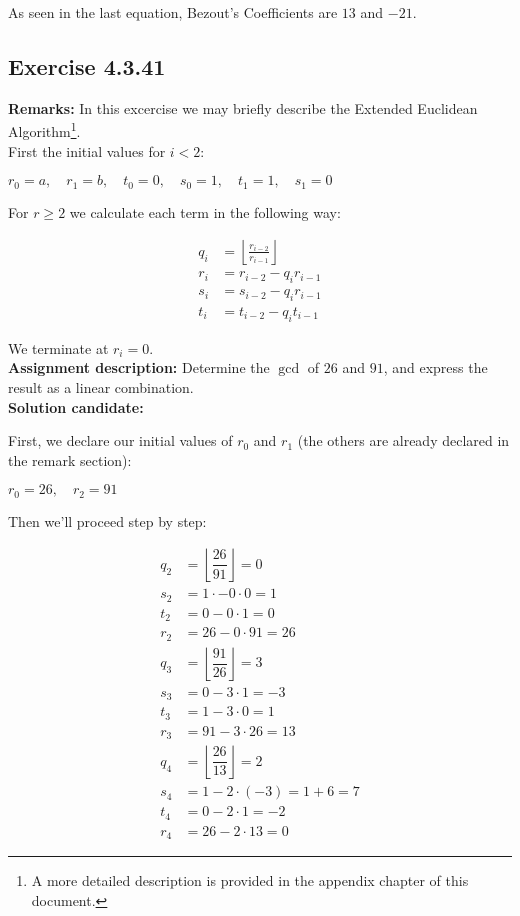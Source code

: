 \documentclass{report}
\newcommand{\cent}[1]{\begin{center}#1\end{center}}
\newcommand{\mAlign}[1]{\begin{align*}#1\end{align*}}
\newcommand{\AssignmentDescription}{\textbf{Assignment description: }}
\newcommand{\myRemark}{\textbf{Remarks: }}
\newcommand{\Solution}{\textbf{Solution candidate: }}
\newcommand{\Exercise}[1]{\subsection{Exercise #1}}
\newcommand{\defaultEnumerateLabel}{\textbf{\alph*.}}
\newcommand{\Floor}[1]{\left \lfloor{#1}\right \rfloor }
\begin{document}
\begin{enumerate}[label=\defaultEnumerateLabel]
\begin{enumerate}[label=\defaultEnumerateLabel]
		As seen in the last equation, Bezout's Coefficients are $13$ and $-21$.\\
	\end{enumerate}
	\Exercise{4.3.41}
	
	\myRemark
	In this excercise we may briefly describe the Extended Euclidean Algorithm\footnote{A more detailed description is provided in the appendix chapter of this document.}.\\
	
	First the initial values for $i < 2$: 
	
	\cent{$r_0 = a, \quad  r_1 = b, \quad  t_0 = 0, \quad  s_0 = 1, \quad  t_1 = 1, \quad  s_1 = 0$}
	
	For $r \geq 2$ we calculate each term in the following way:
	
	\mAlign{
		q_i &= \Floor{\frac{r_{i-2}}{r_{i-1}}} \\
		r_i &= r_{i-2} - q_i r_{i-1} \\
		s_i &= s_{i-2} - q_i r_{i-1} \\
		t_i &= t_{i-2} - q_i t_{i-1}
	}
	
	We terminate at $r_i = 0$.\\
	
	\AssignmentDescription
	Determine the $\gcd$ of $26$ and $91$, and express the result as a linear combination.\\
	
	\Solution
	
	First, we declare our initial values of $r_0$ and $r_1$ (the others are already declared in the remark section):
	
	\cent{$r_0 = 26, \quad r_2 = 91$}
	
	Then we'll proceed step by step:
	
	\mAlign{
		q_2 &= \Floor{\dfrac{26}{91}} = 0 \\
		s_2 &=  1 \cdot - 0 \cdot 0 = 1\\
		t_2 &= 0 - 0 \cdot 1 = 0\\
		r_2 &= 26 - 0 \cdot 91 = 26\\
		q_3 &= \Floor{\dfrac{91}{26}} = 3 \\
		s_3 &= 0 - 3 \cdot 1 = -3 \\
		t_3 &= 1 - 3 \cdot 0 = 1\\
		r_3 &= 91 - 3 \cdot 26 = 13 \\
		q_4 &= \Floor{\dfrac{26}{13}} = 2 \\
		s_4 &=  1 - 2 \cdot (-3) = 1 + 6 = 7 \\
		t_4 &= 0 - 2 \cdot 1 = -2 \\
		r_4 &= 26 - 2 \cdot 13 = 0
	}


\end{enumerate}
\end{document}
